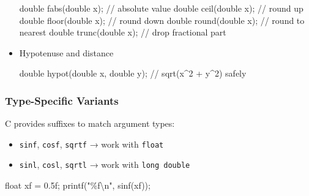\documentclass[
  letterpaper,
  DIV=11,
  numbers=noendperiod]{scrreprt}
\newenvironment{Shaded}{\begin{snugshade}}{\end{snugshade}}
\newcommand{\BuiltInTok}[1]{\textcolor[rgb]{0.00,0.23,0.31}{#1}}
\newcommand{\CommentTok}[1]{\textcolor[rgb]{0.37,0.37,0.37}{#1}}
\newcommand{\DataTypeTok}[1]{\textcolor[rgb]{0.68,0.00,0.00}{#1}}
\newcommand{\FloatTok}[1]{\textcolor[rgb]{0.68,0.00,0.00}{#1}}
\newcommand{\NormalTok}[1]{\textcolor[rgb]{0.00,0.23,0.31}{#1}}
\newcommand{\OperatorTok}[1]{\textcolor[rgb]{0.37,0.37,0.37}{#1}}
\newcommand{\SpecialCharTok}[1]{\textcolor[rgb]{0.37,0.37,0.37}{#1}}
\newcommand{\StringTok}[1]{\textcolor[rgb]{0.13,0.47,0.30}{#1}}
\providecommand{\tightlist}{%
  \setlength{\itemsep}{0pt}\setlength{\parskip}{0pt}}
\begin{document}
\begin{itemize}
\begin{Shaded}
\begin{Highlighting}[]
\DataTypeTok{double}\NormalTok{ fabs}\OperatorTok{(}\DataTypeTok{double}\NormalTok{ x}\OperatorTok{);}     \CommentTok{// absolute value}
\DataTypeTok{double}\NormalTok{ ceil}\OperatorTok{(}\DataTypeTok{double}\NormalTok{ x}\OperatorTok{);}     \CommentTok{// round up}
\DataTypeTok{double}\NormalTok{ floor}\OperatorTok{(}\DataTypeTok{double}\NormalTok{ x}\OperatorTok{);}    \CommentTok{// round down}
\DataTypeTok{double}\NormalTok{ round}\OperatorTok{(}\DataTypeTok{double}\NormalTok{ x}\OperatorTok{);}    \CommentTok{// round to nearest}
\DataTypeTok{double}\NormalTok{ trunc}\OperatorTok{(}\DataTypeTok{double}\NormalTok{ x}\OperatorTok{);}    \CommentTok{// drop fractional part}
\end{Highlighting}
\end{Shaded}
\item
  Hypotenuse and distance

\begin{Shaded}
\begin{Highlighting}[]
\DataTypeTok{double}\NormalTok{ hypot}\OperatorTok{(}\DataTypeTok{double}\NormalTok{ x}\OperatorTok{,} \DataTypeTok{double}\NormalTok{ y}\OperatorTok{);} \CommentTok{// sqrt(x\^{}2 + y\^{}2) safely}
\end{Highlighting}
\end{Shaded}
\end{itemize}

\subsubsection{Type-Specific Variants}\label{type-specific-variants}

C provides suffixes to match argument types:

\begin{itemize}
\tightlist
\item
  \texttt{sinf}, \texttt{cosf}, \texttt{sqrtf} → work with
  \texttt{float}
\item
  \texttt{sinl}, \texttt{cosl}, \texttt{sqrtl} → work with
  \texttt{long\ double}
\end{itemize}

\begin{Shaded}
\begin{Highlighting}[]
\DataTypeTok{float}\NormalTok{ xf }\OperatorTok{=} \FloatTok{0.5}\BuiltInTok{f}\OperatorTok{;}
\NormalTok{printf}\OperatorTok{(}\StringTok{"}\SpecialCharTok{\%f\textbackslash{}n}\StringTok{"}\OperatorTok{,}\NormalTok{ sinf}\OperatorTok{(}\NormalTok{xf}\OperatorTok{));}
\end{Highlighting}
\end{Shaded}
\end{document}
